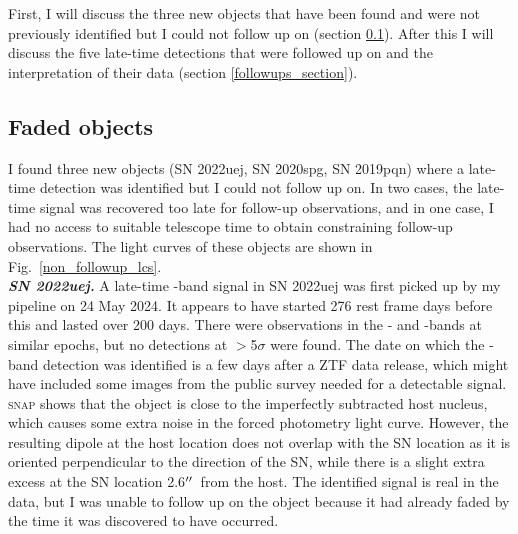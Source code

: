 \documentclass[a4paper,oneside,12pt, class=Latex/Classes/PhDthesisPSnPDF, crop=false]{standalone}
\begin{document}
First, I will discuss the three new objects that have been found and were not previously identified but I could not follow up on (section \ref{sec:faded_objects}). After this I will discuss the five late-time detections that were followed up on and the interpretation of their data (section \ref{followups_section}).

\subsection{Faded objects}
\label{sec:faded_objects}
I found three new objects (SN 2022uej, SN 2020spg, SN 2019pqn) where a late-time detection was identified but I could not follow up on. In two cases, the late-time signal was recovered too late for follow-up observations, and in one case, I had no access to suitable telescope time to obtain constraining follow-up observations. The light curves of these objects are shown in Fig.~\ref{non_followup_lcs}.\\

\textit{\textbf{SN 2022uej.}}
A late-time \ztfr-band signal in SN 2022uej was first picked up by my pipeline on 24 May 2024. It appears to have started 276 rest frame days before this and lasted over 200 days. There were observations in the \ztfg- and \ztfi-bands at similar epochs, but no detections at $>$5$\sigma$ were found. The date on which the \ztfr-band detection was identified is a few days after a ZTF data release, which might have included some images from the public survey needed for a detectable signal. \textsc{snap} shows that the object is close to the imperfectly subtracted host nucleus, which causes some extra noise in the forced photometry light curve. However, the resulting dipole at the host location does not overlap with the SN location as it is oriented perpendicular to the direction of the SN, while there is a slight extra excess at the SN location 2.6$^{\prime\prime}$\ from the host. The identified signal is real in the data, but I was unable to follow up on the object because it had already faded by the time it was discovered to have occurred.\\
\end{document}
